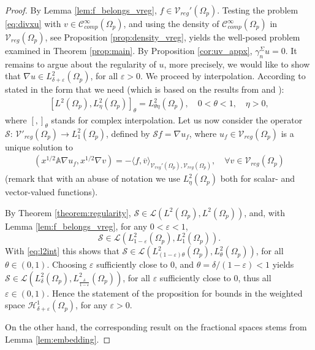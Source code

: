 \documentclass[report]{elsarticle}
\numberwithin{theorem}{section}
\newcommand{\re}{\varepsilon}
\begin{document}
\begin{proof}
By Lemma \ref{lem:f_belongs_vreg}, $f\in \mathcal{V}_{reg}'(\Omega_p)$. Testing the problem \eqref{eq:divxu} with $v\in \mathcal{C}_{comp}^{\infty}(\Omega_p)$, and using the density of $\mathcal{C}_{comp}^{\infty}(\Omega_p)$ in $\mathcal{V}_{reg}(\Omega_p)$, see Proposition \ref{prop:density_vreg},  yields the well-posed problem examined in Theorem \ref{prop:main}. By Proposition \ref{cor:uv_appx}, $\gamma_n^{\Sigma}u=0$. 
It remains to argue about the regularity of $u$, more precisely, we would like to show that $\nabla u\in L^2_{\delta+\re}(\Omega_p)$, for all $\re>0$. We proceed by interpolation. According to \cite[Theorem 3.1]{cwikel_einav} stated in the form that we need (which is based on the results from \cite{stein_weiss} and \cite{calderon}):
\begin{align}
	\label{eq:l2int}
	[ L^2(\Omega_p), L^2_{\eta}(\Omega_p)]_{\theta}=L^2_{{\theta\eta}}(\Omega_p), \quad 0<\theta<1, \quad \eta>0,
\end{align}
where $[,]_{\theta}$ stands for complex interpolation. 
Let us now consider the operator $\mathcal{S}: \, \mathcal{V}'_{reg}(\Omega_p)\rightarrow L^2_{1}(\Omega_p)$, defined by $\mathcal{S}f=\nabla u_f$, where $u_f\in \mathcal{V}_{reg}(\Omega_p)$ is a unique solution to
\begin{align*}
	(x^{1/2}\mathbb{A}\nabla u_f, x^{1/2}\nabla v)=-\langle f, \overline{v}\rangle_{\mathcal{V}_{reg}'(\Omega_p), \mathcal{V}_{reg}(\Omega_p)}, \quad \forall v\in \mathcal{V}_{reg}(\Omega_p)
\end{align*}
(remark that with an abuse of notation we use $L^2_{\eta}(\Omega_p)$ both for scalar- and vector-valued functions). 


By Theorem \ref{theorem:regularity}, $\mathcal{S}\in \mathcal{L}(L^2(\Omega_p), L^2(\Omega_p))$, and, with Lemma \ref{lem:f_belongs_vreg}, for any $0<\re<1$, $$\mathcal{S}\in \mathcal{L}(L^2_{1-\re}(\Omega_p), L^2_{1}(\Omega_p)).$$ With \eqref{eq:l2int} this shows that $\mathcal{S}\in \mathcal{L}(L^2_{(1-\re)\theta}(\Omega_p), L^2_{\theta}(\Omega_p))$, for all $\theta\in (0,1)$. Choosing $\re$ sufficiently close to $0$, and $\theta=\delta/(1-\re)<1$ yields $\mathcal{S}\in \mathcal{L}(L^2_{\delta}(\Omega_p), L^2_{\frac{\delta}{1-\re}}(\Omega_p))$, for all $\re$ sufficiently close to $0$, thus all $\re\in (0,1)$. Hence the statement of the proposition for bounds in the  weighted space $\mathcal{H}^1_{\delta+\re}(\Omega_p)$, for any $\re>0$. 

On the other hand, the corresponding result on the fractional spaces stems from Lemma \ref{lem:embedding}. 
\end{proof}
\end{document}
